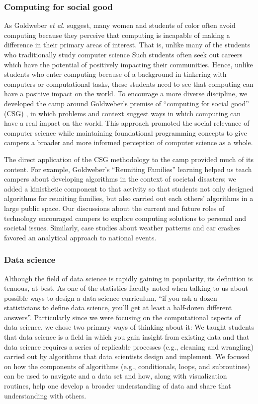 \subsubsection{Computing for social good}

As Goldweber \textit{et al.} \cite{Goldweber2013} suggest, many women
and students of color often avoid computing because they perceive
that computing is incapable of making a difference in their primary
areas of interest.  That is, unlike many of the students who
traditionally study computer science Such students often seek out
careers which have the potential of positively impacting their
communities.  Hence, unlike students who enter computing because
of a background in tinkering with computers or computational tasks,
these students need to see that computing can have a positive impact
on the world.  To encourage a more diverse discipline, we developed
the camp around Goldweber's premise of ``computing for social good''
(CSG) \cite{Goldweber2015}, in which problems and context suggest ways
in which computing can have a real impact on the world.  This
approach promoted the social relevance of computer science while
maintaining foundational programming concepts to give campers a
broader and more informed perception of computer science as a whole.

The direct application of the CSG methodology to the camp provided
much of its content. For example, Goldweber's ``Reuniting Families''
learning helped us teach campers about developing algorithms in the
context of societal disasters; we added a kinisthetic component to
that activity so that students not only designed algorithms for
reuniting families, but also carried out each others' algorithms
in a large public space.  Our discussions about the current and
future roles of technology encouraged campers to explore computing
solutions to personal and societal issues.  Similarly, case studies
about weather patterns and car crashes favored an analytical approach
to national events.

\subsubsection{Data science}

Although the field of data science is rapidly gaining in popularity,
its definition is tenuous, at best.  As one of the statistics faculty
noted when talking to us about possible ways to design a data science
curriculum, ``if you ask a dozen statisticians to define data
science, you'll get at least a half-dozen different answers''.
Particularly since we were focusing on the computational aspects
of data science, we chose two primary ways of thinking about it:
We taught students that data science is a field in which you gain
insight from existing data and that data science requires a series
of replicable processes (e.g., cleaning and wrangling) carried out
by algorithms that data scientists design and implement.  We focused
on how the components of algorithms (e.g., conditionals,  loops,
and subroutines) can be used to navigate and a data set and how,
along with visualization routines, help one develop a broader understanding
of data and share that understanding with others.

